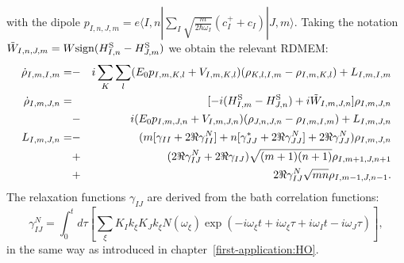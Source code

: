 \documentclass[12pt,twoside,a4paper]{report}
\begin{document}
{with the dipole 
$p
 _{I,n,J,m}
           =
              e
              \langle I,n| 
                 {\sum \limits_I 
                     \sqrt{\frac{m}{2\hbar\omega_I}}
                     (c_I^+ + c_I)} 
              |J,m \rangle $.
Taking the notation 
$\tilde 
 W
 _{I,n,J,m}
            =
               W {\rm sign}
               (H^{\rm S}_{I,n}-H^{\rm S}_{J,m})$
we obtain the relevant RDMEM:
\begin{eqnarray} 
\dot 
\rho_{I,m,I,m}
              =
                &-&  i\sum \limits_K 
                          \sum \limits_l
                              (E_0 {p_{I,m,K,l}}+{V_{I,m,K,l}}) 
                              (\rho_{K,l,I,m}-\rho_{I,m,K,l})
                 +   L_{I,m,I,m} \nonumber \\
\dot 
\rho_{I,m,J,n}
               =
                 & &   [-i(H^{\rm S}_{I,m}-H^{\rm S}_{J,n})
                       +i \tilde W_{I,m,J,n}] 
                       \rho_{I,m,J,n}  \\
                 &-&   i(E_0 {p_{I,m,J,n}}+{V_{I,m,J,n}}) 
                       (\rho_{J,n,J,n}-\rho_{I,m,I,m})
                  +    L_{I,m,J,n} \nonumber \\ 
L_{I,m,J,n}
              =
                &-&  ( m[ {\gamma_{II}}  +2\Re {\gamma_{II}^N}]
                      +n[ {\gamma_{JJ}^*}+2\Re {\gamma_{JJ}^N}]
                      +2\Re {\gamma_{JJ}^N})
                      \rho_{I,m,J,n}  \nonumber \\ 
                &+&   ( 2\Re {\gamma_{IJ}^N}
                       +2\Re {\gamma_{IJ}})\sqrt{(m+1)(n+1)} 
                      \rho_{I,m+1,J,n+1}  \nonumber \\ 
                &+&   2\Re {\gamma_{IJ}^N}\sqrt{mn}
                      \rho_{I,m-1,J,n-1}.  \nonumber 
\end{eqnarray} 
The relaxation functions {$\gamma_{IJ}$} are derived from the bath correlation 
functions:
$$
{\gamma
   _{IJ}
   ^N}
          = 
             \int_0^t d\tau 
                \left[
                   \sum \limits_\xi 
                     {K_I k_\xi K_J k_\xi} 
                     {N(\omega_\xi)} 
                     \exp{(
                         -  i\omega_\xi t  
                         +  i\omega_\xi \tau 
                         +  i\omega_I t 
                         -  i\omega _J \tau)}
               \right],$$ 
in the same way as introduced in 
 chapter~\ref{first-application:HO}.  

%
%
%
%
%
%
%
}
\end{document}
